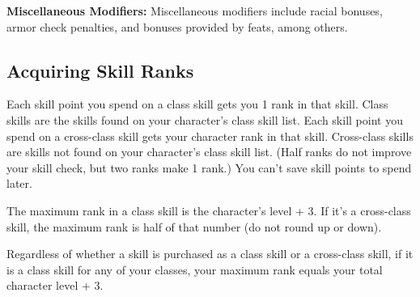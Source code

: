 \textbf{Miscellaneous Modifiers:} Miscellaneous modifiers include racial bonuses, armor check penalties, and bonuses provided by feats, among others.

\subsection{Acquiring Skill Ranks}
Each skill point you spend on a class skill gets you 1 rank in that skill. Class skills are the skills found on your character's class skill list. Each skill point you spend on a cross-class skill gets your character \onehalf rank in that skill. Cross-class skills are skills not found on your character's class skill list. (Half ranks do not improve your skill check, but two \onehalf ranks make 1 rank.) You can't save skill points to spend later.

The maximum rank in a class skill is the character's level + 3. If it's a cross-class skill, the maximum rank is half of that number (do not round up or down).

Regardless of whether a skill is purchased as a class skill or a cross-class skill, if it is a class skill for any of your classes, your maximum rank equals your total character level + 3.


